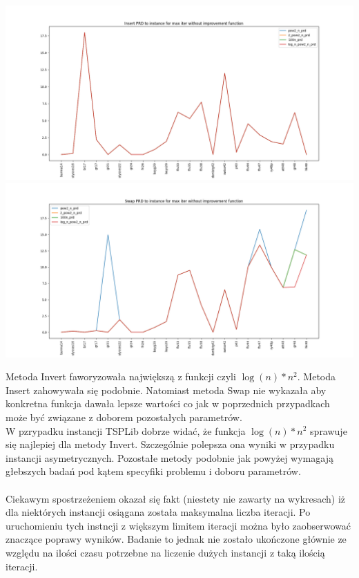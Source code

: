 \documentclass{article}
\begin{document}
\begin{multicols}{2}
\begin{center}
      \includegraphics[scale=0.2]{impiter_ins_prd.png}
      \includegraphics[scale=0.2]{impiter_swp_prd.png}
  \end{center}
\end{multicols}
Metoda Invert faworyzowała największą z funkcji czyli $\log(n) * n^2$. Metoda Insert
zahowywała się podobnie. Natomiast metoda Swap nie wykazała aby konkretna funkcja dawała
lepsze wartości co jak w poprzednich przypadkach może być związane z doborem pozostałych
parametrów.\\

W pzrypadku instancji TSPLib dobrze widać, że funkcja $\log(n) * n^2$ sprawuje się najlepiej
dla metody Invert. Szczególnie polepsza ona wyniki w przypadku instancji asymetrycznych. Pozostałe
metody podobnie jak powyżej wymagają głebszych badań pod kątem specyfiki problemu i doboru parametrów.
\\~\\
Ciekawym spostrzeżeniem okazał się fakt (niestety nie zawarty na wykresach) iż dla niektórych
instancji osiągana została maksymalna liczba iteracji. Po uruchomieniu tych instncji z większym limitem iteracji
można było zaobserwować znaczące poprawy wyników. Badanie to jednak nie zostało ukończone głównie ze
względu na ilości czasu potrzebne na liczenie dużych instancji z taką ilością iteracji.
\end{document}
